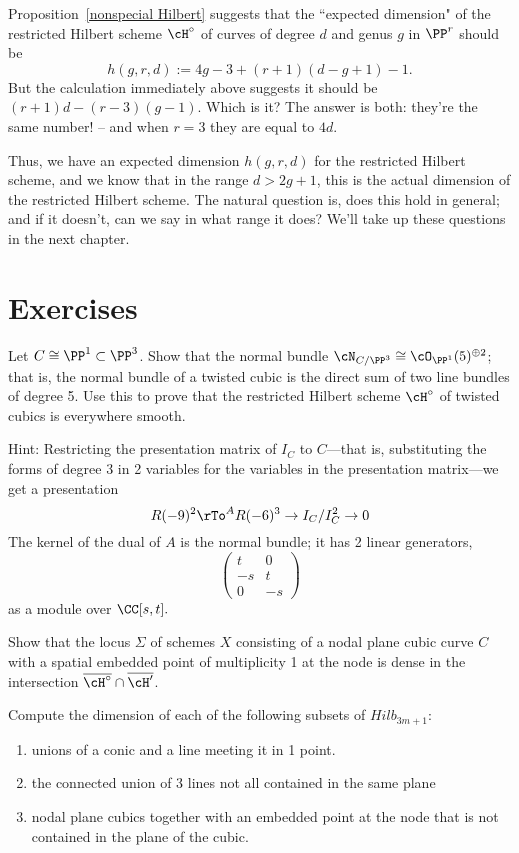 Proposition~\ref{nonspecial Hilbert} suggests that the ``expected dimension" of the restricted Hilbert scheme $\cH^\circ$ of curves of degree $d$ and genus $g$ in $\PP^r$ should be 
$$
h(g,r,d) := 4g-3 + (r+1)(d-g+1) - 1.
$$
But the calculation immediately above suggests it should be $(r+1)d - (r-3)(g-1)$. Which is it? The answer is both: they're the same number! -- and when $r=3$ they are equal to $4d$.

Thus, we have an expected dimension $h(g,r,d)$ for the restricted Hilbert scheme, and we know that in the range $d > 2g+1$, this is the actual dimension of the restricted Hilbert scheme. The natural question is, does this hold in general; and if it doesn't, can we say in what range it does? We'll take up these questions in the next chapter.

\section{Exercises}
\begin{exercise}\label{twisted cubic normal bundle}
Let $C \cong \PP^1 \subset \PP^3$. Show that the normal bundle $\cN_{C/\PP^3} \cong \cO_{\PP^1}(5)^{\oplus 2}$; that is, the normal bundle of a twisted cubic is the direct sum of two line bundles of degree 5. Use this to prove that the restricted Hilbert scheme $\cH^\circ$ of twisted cubics is everywhere smooth. \end{exercise}

Hint: Restricting the presentation matrix of $I_C$ to $C$---that is, substituting the forms of degree 3 in 2 variables for the variables in the presentation matrix---we get a presentation 
$$
R(-9)^2 \rTo^A R(-6)^3 \to I_C/I_C^2 \to 0 
$$
The kernel of the dual of $A$ is the normal bundle; it has 2 linear generators, 
$$
\begin{pmatrix}
t&0\\
-s&t\\
0&-s
\end{pmatrix}
$$
as a module over $\CC[s,t].$


\begin{exercise}\label{hilb intersection}
Show that the locus $\Sigma$ of schemes $X$ consisting of a nodal plane cubic curve $C$ with a spatial embedded point of multiplicity 1 at the node is dense in the intersection $\overline{\cH^\circ} \cap \overline{\cH'}$.
\end{exercise}

\begin{exercise}
 Compute the dimension of each of the following subsets of $Hilb_{3m+1}$:
 
\begin{enumerate}
 \item unions of a conic and a line meeting it in 1 point.
 \item the connected union of 3 lines not all contained in the same plane
 \item nodal plane cubics together with an embedded point at the node that is not contained in the plane of
 the cubic.
\end{enumerate}
\end{exercise}

